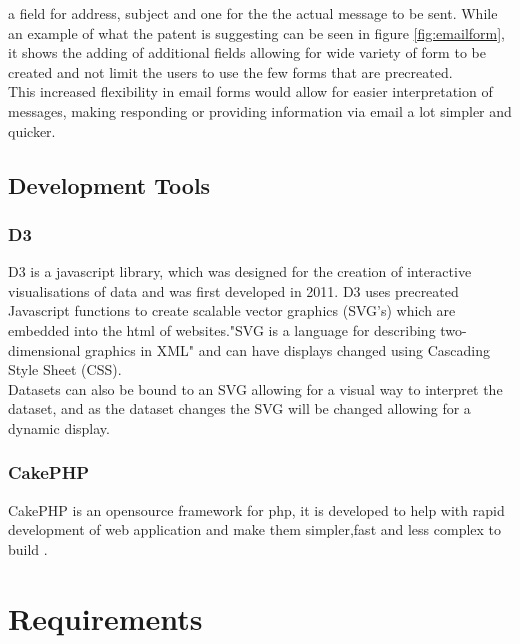 \documentclass[12pt]{article}  %
\begin{document}
\noindent
a field for address, subject and one for the the actual message to be sent. While an example of what the patent is suggesting can be seen in figure \ref{fig:emailform}, it shows the adding of additional fields allowing for wide variety of form to be created and not limit the  users to use the few forms that are precreated.\\
This increased flexibility in email forms would allow for easier  interpretation of messages, making responding or providing information via email a lot simpler and quicker.


\subsection{Development Tools}
\subsubsection{D3}
D3 \cite{bostock_d3.js_????} is a javascript library, which was designed for the creation of interactive visualisations of data and was first developed in 2011. D3 uses precreated Javascript functions to create scalable vector graphics (SVG's) which are embedded into the html of websites."SVG is a language for describing two-dimensional graphics in XML"\cite{ferraiolo_scalable_2000} and can have displays changed  using Cascading Style Sheet (CSS).  \\
Datasets can also be bound to an SVG allowing for a visual way to interpret the dataset, and as the dataset changes the SVG will be changed allowing for a dynamic display.  

\subsubsection{CakePHP}
CakePHP is an opensource framework for php, it is developed to help with rapid development of web application and make them simpler,fast and less complex to build \cite{_cakephp_????}.  





\newpage
\section{Requirements}
 
\end{document}
